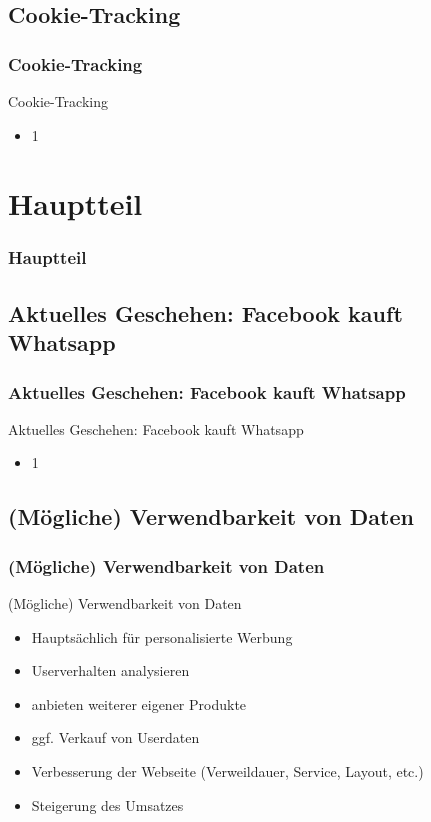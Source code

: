 \documentclass[xcolor=dvipsnames]{beamer}
\begin{document}
\subsection{Cookie-Tracking}
\begin{frame} %
  \frametitle{Cookie-Tracking} %
  \begin{block}{Cookie-Tracking}
	  \begin{itemize}
	  	\item 1
	  \end{itemize}
  \end{block}
\end{frame}


\section{Hauptteil}
\begin{frame} %
  \frametitle{Hauptteil} %
\end{frame}

\subsection{Aktuelles Geschehen: Facebook kauft Whatsapp}
\begin{frame} %
  \frametitle{Aktuelles Geschehen: Facebook kauft Whatsapp} %
  \begin{block}{Aktuelles Geschehen: Facebook kauft Whatsapp}
	  \begin{itemize}
		\item 1
	  \end{itemize}
  \end{block}
\end{frame}


\subsection{(Mögliche) Verwendbarkeit von Daten}
\begin{frame} %
  \frametitle{(Mögliche) Verwendbarkeit von Daten} %
  \begin{block}{(Mögliche) Verwendbarkeit von Daten}
	  \begin{itemize}
	  	\item Hauptsächlich für personalisierte Werbung
		\item Userverhalten analysieren
		\item anbieten weiterer eigener Produkte
		\item ggf. Verkauf von Userdaten
		\item Verbesserung der Webseite (Verweildauer, Service, Layout, etc.)
		\item Steigerung des Umsatzes
	  \end{itemize}
  \end{block}
\end{frame}
\end{document}

